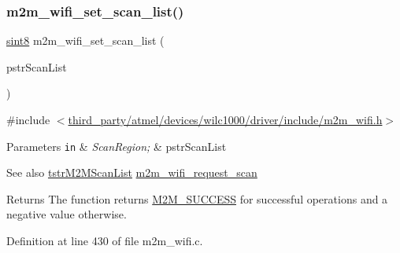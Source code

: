 \subsubsection{\texorpdfstring{m2m\+\_\+wifi\+\_\+set\+\_\+scan\+\_\+list()}{m2m\_wifi\_set\_scan\_list()}}
{\footnotesize\ttfamily \hyperlink{group__DataT_gae35f10ffd0ac8dd2bc3e794da9bdfbc7}{sint8} m2m\+\_\+wifi\+\_\+set\+\_\+scan\+\_\+list (\begin{DoxyParamCaption}\item[{\hyperlink{structtstrM2MScanList}{tstr\+M2\+M\+Scan\+List} $\ast$}]{pstr\+Scan\+List }\end{DoxyParamCaption})}



{\ttfamily \#include $<$\hyperlink{m2m__wifi_8h}{third\+\_\+party/atmel/devices/wilc1000/driver/include/m2m\+\_\+wifi.\+h}$>$}


\begin{DoxyParams}[1]{Parameters}
\mbox{\tt in}  & {\em Scan\+Region;} & pstr\+Scan\+List\\
\hline
\end{DoxyParams}
\begin{DoxySeeAlso}{See also}
\hyperlink{structtstrM2MScanList}{tstr\+M2\+M\+Scan\+List} \hyperlink{group__WifiRequestScanFn_ga499dfa24a19c2e84776aeabedf897135}{m2m\+\_\+wifi\+\_\+request\+\_\+scan}
\end{DoxySeeAlso}
\begin{DoxyReturn}{Returns}
The function returns \hyperlink{nm__common_8h_a9ef27ba27aafdd1aa3a79d3ba2c36b8f}{M2\+M\+\_\+\+S\+U\+C\+C\+E\+SS} for successful operations and a negative value otherwise. 
\end{DoxyReturn}


Definition at line 430 of file m2m\+\_\+wifi.\+c.



